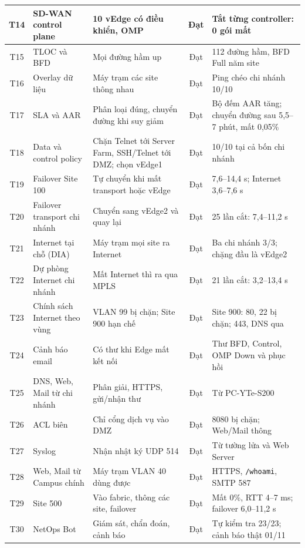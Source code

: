 \begin{longtable}{|c|L{3.3cm}|L{3.6cm}|c|L{\dimexpr\textwidth-0.9cm-3.3cm-3.6cm-1.1cm-10\arrayrulewidth\relax}|}
    \hline
    T14 & SD-WAN control plane & 10 vEdge có điều khiển, OMP & Đạt & Tắt từng controller: 0 gói mất \\
    \hline
    T15 & TLOC và BFD & Mọi đường hầm up & Đạt & 112 đường hầm, BFD Full năm site \\
    \hline
    T16 & Overlay dữ liệu & Máy trạm các site thông nhau & Đạt & Ping chéo chi nhánh 10/10 \\
    \hline
    T17 & SLA và AAR & Phân loại đúng, chuyển đường khi suy giảm & Đạt & Bộ đếm AAR tăng; chuyển đường sau 5,5--7 phút, mất 0,05\% \\
    \hline
    T18 & Data và control policy & Chặn Telnet tới Server Farm, SSH/Telnet tới DMZ; chọn vEdge1 & Đạt & 10/10 tại cả bốn chi nhánh \\
    \hline
    T19 & Failover Site 100 & Tự chuyển khi mất transport hoặc vEdge & Đạt & 7,6--14,4 s; Internet 3,6--7,6 s \\
    \hline
    T20 & Failover transport chi nhánh & Chuyển sang vEdge2 và quay lại & Đạt & 25 lần cắt: 7,4--11,2 s \\
    \hline
    T21 & Internet tại chỗ (DIA) & Máy trạm mọi site ra Internet & Đạt & Ba chi nhánh 3/3; chặng đầu là vEdge2 \\
    \hline
    T22 & Dự phòng Internet chi nhánh & Mất Internet thì ra qua MPLS & Đạt & 21 lần cắt: 3,2--13,4 s \\
    \hline
    T23 & Chính sách Internet theo vùng & VLAN 99 bị chặn; Site 900 hạn chế & Đạt & Site 900: 80, 22 bị chặn; 443, DNS qua \\
    \hline
    T24 & Cảnh báo email & Có thư khi Edge mất kết nối & Đạt & Thư BFD, Control, OMP Down và phục hồi \\
    \hline
    T25 & DNS, Web, Mail từ chi nhánh & Phân giải, HTTPS, gửi/nhận thư & Đạt & Từ PC-YTe-S200 \\
    \hline
    T26 & ACL biên & Chỉ cổng dịch vụ vào DMZ & Đạt & 8080 bị chặn; Web/Mail thông \\
    \hline
    T27 & Syslog & Nhận nhật ký UDP 514 & Đạt & Từ tường lửa và Web Server \\
    \hline
    T28 & Web, Mail từ Campus chính & Máy trạm VLAN 40 dùng được & Đạt & HTTPS, \texttt{/whoami}, SMTP 587 \\
    \hline
    T29 & Site 500 & Vào fabric, thông các site, failover & Đạt & Mất 0\%, RTT 4--7 ms; failover 6,0--11,2 s \\
    \hline
    T30 & NetOps Bot & Giám sát, chẩn đoán, cảnh báo & Đạt & Tự kiểm tra 23/23; cảnh báo thật 01/11 \\
\end{longtable}
\endgroup


